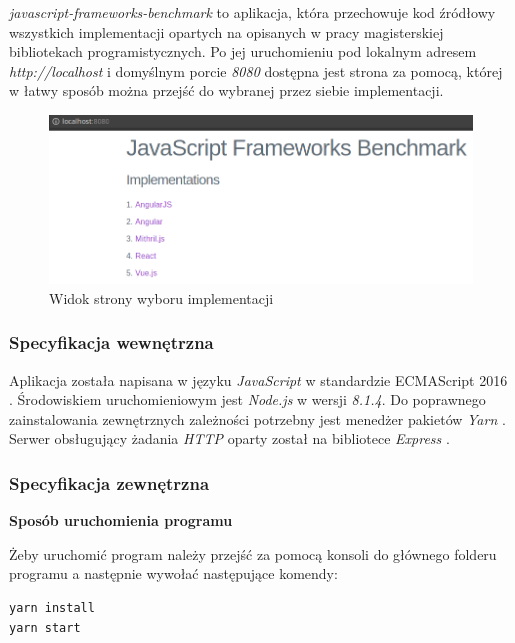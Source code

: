 \documentclass[polish, twoside, 12pt]{mwart}
\begin{document}
\emph{javascript-frameworks-benchmark} to aplikacja, która przechowuje kod źródłowy wszystkich implementacji opartych na opisanych w pracy magisterskiej bibliotekach programistycznych. Po jej uruchomieniu pod lokalnym adresem \emph{http://localhost} i domyślnym porcie \emph{8080} dostępna jest strona za pomocą, której w łatwy sposób można przejść do wybranej przez siebie implementacji.

\begin{figure}[ht]
  \includegraphics[width=\textwidth]{javascript-frameworks-benchmark.png}
	\caption{Widok strony wyboru implementacji}
\end{figure}

\subsubsection{Specyfikacja wewnętrzna}

Aplikacja została napisana w języku \emph{JavaScript} w standardzie ECMAScript 2016 \cite{es2016}. Środowiskiem uruchomieniowym jest \emph{Node.js} \cite{node.js} w wersji \emph{8.1.4}. Do poprawnego zainstalowania zewnętrznych zależności potrzebny jest menedżer pakietów \emph{Yarn} \cite{yarn}. Serwer obsługujący żadania \emph{HTTP} oparty został na bibliotece \emph{Express} \cite{express}.

\subsubsection{Specyfikacja zewnętrzna}

\textbf{Sposób uruchomienia programu} \newline

Żeby uruchomić program należy przejść za pomocą konsoli do głównego folderu programu a następnie wywołać następujące komendy:

\begin{lstlisting}
yarn install
yarn start
\end{lstlisting}
\end{document}

